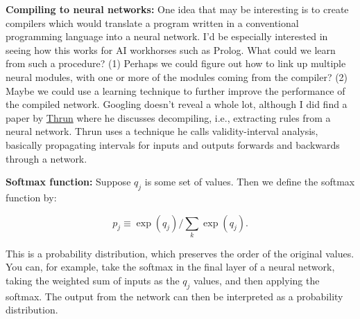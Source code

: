 \documentclass[12pt]{article}
\newcommand{\link}[2]{\href{#1}{#2}}
\begin{document}
\textbf{Compiling to neural networks:} One idea that may be
  interesting is to create compilers which would translate a program
  written in a conventional programming language into a neural
  network.  I'd be especially interested in seeing how this works for
  AI workhorses such as Prolog.  What could we learn from such a
  procedure?  (1) Perhaps we could figure out how to link up multiple
  neural modules, with one or more of the modules coming from the
  compiler? (2) Maybe we could use a learning technique to further
  improve the performance of the compiled network.  Googling doesn't
  reveal a whole lot, although I did find a paper by
  \link{http://scholar.google.ca/scholar?cluster=10518384657895134615\&hl=en\&as\_sdt=0,5}{Thrun}
  where he discusses decompiling, i.e., extracting rules from a neural
  network.  Thrun uses a technique he calls validity-interval
  analysis, basically propagating intervals for inputs and outputs
  forwards and backwards through a network.

\textbf{Softmax function:} Suppose $q_j$ is some set of values.  Then
  we define the softmax function by:

$$p_j \equiv \exp(q_j)/\sum_k \exp(q_j).$$
  
This is a probability distribution, which preserves the order of the
original values.  You can, for example, take the softmax in the final
layer of a neural network, taking the weighted sum of inputs as the
$q_j$ values, and then applying the softmax.  The output from the
network can then be interpreted as a probability distribution.
\end{document}
